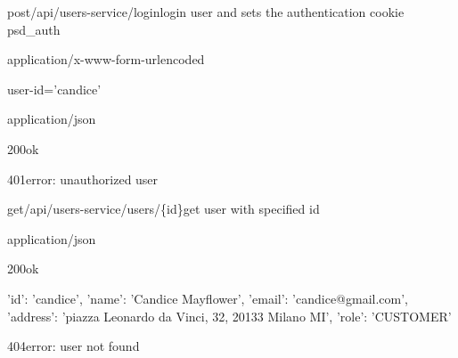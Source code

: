 \begin{apiRoute}{post}{/api/users-service/login}{login user and sets the authentication cookie psd\_auth}
	\begin{routeParameter}
	\end{routeParameter}
	\begin{routeRequest}{application/x-www-form-urlencoded}
		\begin{routeRequestBody}
user-id='candice'

		\end{routeRequestBody}
	\end{routeRequest}
	\begin{routeResponse}{application/json}
    	\begin{routeResponseItem}{200}{ok}
    	    \begin{routeResponseItemBody}
			\end{routeResponseItemBody}
    	\end{routeResponseItem}
    	\begin{routeResponseItem}{401}{error: unauthorized user}
    	    \begin{routeResponseItemBody}
			\end{routeResponseItemBody}
    	\end{routeResponseItem}
	\end{routeResponse}
\end{apiRoute}

\begin{apiRoute}{get}{/api/users-service/users/\{id\}}{get user with specified id}
	\begin{routeParameter}
		\routeParamItem{id}{id of the user}
	\end{routeParameter}
	\begin{routeResponse}{application/json}
		\begin{routeResponseItem}{200}{ok}
			\begin{routeResponseItemBody}
{
    'id': 'candice',
    'name': 'Candice Mayflower',
    'email': 'candice@gmail.com',
    'address': 'piazza Leonardo da Vinci, 32, 20133 Milano MI',
    'role': 'CUSTOMER'
}
			\end{routeResponseItemBody}
		\end{routeResponseItem}
		\begin{routeResponseItem}{404}{error: user not found}
		    \begin{routeResponseItemBody}
			\end{routeResponseItemBody}
		\end{routeResponseItem}
	\end{routeResponse}
\end{apiRoute}

